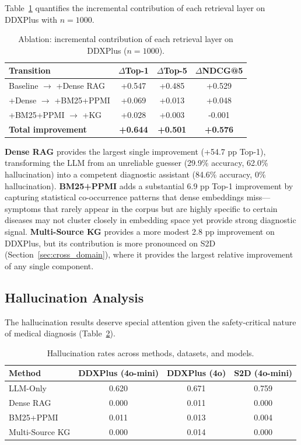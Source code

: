 \documentclass[preprint,12pt]{elsarticle}
\begin{document}
Table~\ref{tab:ablation} quantifies the incremental contribution of each retrieval layer on DDXPlus with $n{=}1000$.

\begin{table}[t]
\centering
\caption{Ablation: incremental contribution of each retrieval layer on DDXPlus ($n{=}1000$).}
\label{tab:ablation}
\begin{tabular}{lccc}
\toprule
\textbf{Transition} & \textbf{$\Delta$Top-1} & \textbf{$\Delta$Top-5} & \textbf{$\Delta$NDCG@5} \\
\midrule
Baseline $\to$ +Dense RAG    & +0.547 & +0.485 & +0.529 \\
+Dense $\to$ +BM25+PPMI      & +0.069 & +0.013 & +0.048 \\
+BM25+PPMI $\to$ +KG         & +0.028 & +0.003 & -0.001 \\
\midrule
\textbf{Total improvement}   & \textbf{+0.644} & \textbf{+0.501} & \textbf{+0.576} \\
\bottomrule
\end{tabular}
\end{table}

\textbf{Dense RAG} provides the largest single improvement (+54.7 pp Top-1), transforming the LLM from an unreliable guesser (29.9\% accuracy, 62.0\% hallucination) into a competent diagnostic assistant (84.6\% accuracy, 0\% hallucination). \textbf{BM25+PPMI} adds a substantial 6.9 pp Top-1 improvement by capturing statistical co-occurrence patterns that dense embeddings miss---symptoms that rarely appear in the corpus but are highly specific to certain diseases may not cluster closely in embedding space yet provide strong diagnostic signal. \textbf{Multi-Source KG} provides a more modest 2.8 pp improvement on DDXPlus, but its contribution is more pronounced on S2D (Section~\ref{sec:cross_domain}), where it provides the largest relative improvement of any single component.

\subsection{Hallucination Analysis}
\label{sec:hallucination}

The hallucination results deserve special attention given the safety-critical nature of medical diagnosis (Table~\ref{tab:halluc}).

\begin{table}[t]
\centering
\caption{Hallucination rates across methods, datasets, and models.}
\label{tab:halluc}
\begin{tabular}{lccc}
\toprule
\textbf{Method} & \textbf{DDXPlus (4o-mini)} & \textbf{DDXPlus (4o)} & \textbf{S2D (4o-mini)} \\
\midrule
LLM-Only        & 0.620 & 0.671 & 0.759 \\
Dense RAG        & 0.000 & 0.011 & 0.000 \\
BM25+PPMI        & 0.011 & 0.013 & 0.004 \\
Multi-Source KG  & 0.000 & 0.014 & 0.000 \\
\bottomrule
\end{tabular}
\end{table}
\end{document}
